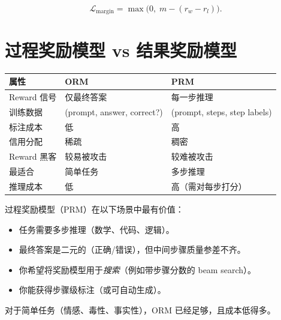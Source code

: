\[
\mathcal{L}_{\text{margin}} = \max\!\bigl(0,\; m - (r_w - r_l)\bigr).
\]

\section{过程奖励模型 vs 结果奖励模型}
\label{sec:prm-orm}

\begin{keybox}
\begin{center}
\begin{tabular}{@{}l l l@{}}
\toprule
\textbf{属性} & \textbf{ORM} & \textbf{PRM} \\
\midrule
Reward 信号 & 仅最终答案 & 每一步推理 \\
训练数据 & (prompt, answer, correct?) & (prompt, steps, step labels) \\
标注成本 & 低 & 高 \\
信用分配 & 稀疏 & 稠密 \\
Reward 黑客 & 较易被攻击 & 较难被攻击 \\
最适合 & 简单任务 & 多步推理 \\
推理成本 & 低 & 高（需对每步打分） \\
\bottomrule
\end{tabular}
\end{center}
\end{keybox}

\begin{intuitionbox}
过程奖励模型（PRM）在以下场景中最有价值：

\begin{itemize}
  \item 任务需要多步推理（数学、代码、逻辑）。
  \item 最终答案是二元的（正确/错误），但中间步骤质量参差不齐。
  \item 你希望将奖励模型用于\emph{搜索}（例如带步骤分数的 beam search）。
  \item 你能获得步骤级标注（或可自动生成）。
\end{itemize}

对于简单任务（情感、毒性、事实性），ORM 已经足够，且成本低得多。
\end{intuitionbox}

